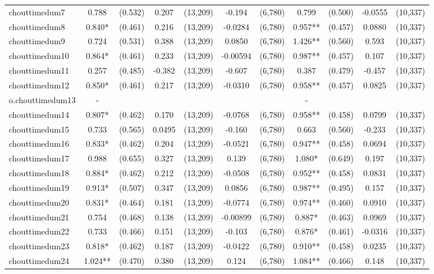 \documentclass[]{article}
\begin{document}
\begin{tabular}{lcccccccccc}
chouttimedum7 & 0.788 & (0.532) & 0.207 & (13,209) & -0.194 & (6,780) & 0.799 & (0.500) & -0.0555 & (10,337) \\
chouttimedum8 & 0.840* & (0.461) & 0.216 & (13,209) & -0.0284 & (6,780) & 0.957** & (0.457) & 0.0880 & (10,337) \\
chouttimedum9 & 0.724 & (0.531) & 0.388 & (13,209) & 0.0850 & (6,780) & 1.426** & (0.560) & 0.593 & (10,337) \\
chouttimedum10 & 0.864* & (0.461) & 0.233 & (13,209) & -0.00594 & (6,780) & 0.987** & (0.457) & 0.107 & (10,337) \\
chouttimedum11 & 0.257 & (0.485) & -0.382 & (13,209) & -0.607 & (6,780) & 0.387 & (0.479) & -0.457 & (10,337) \\
chouttimedum12 & 0.850* & (0.461) & 0.217 & (13,209) & -0.0310 & (6,780) & 0.958** & (0.457) & 0.0825 & (10,337) \\
o.chouttimedum13 & - &  &  &  &  &  & - &  &  &  \\
chouttimedum14 & 0.807* & (0.462) & 0.170 & (13,209) & -0.0768 & (6,780) & 0.958** & (0.458) & 0.0799 & (10,337) \\
chouttimedum15 & 0.733 & (0.565) & 0.0495 & (13,209) & -0.160 & (6,780) & 0.663 & (0.560) & -0.233 & (10,337) \\
chouttimedum16 & 0.833* & (0.462) & 0.204 & (13,209) & -0.0521 & (6,780) & 0.947** & (0.458) & 0.0694 & (10,337) \\
chouttimedum17 & 0.988 & (0.655) & 0.327 & (13,209) & 0.139 & (6,780) & 1.080* & (0.649) & 0.197 & (10,337) \\
chouttimedum18 & 0.884* & (0.462) & 0.212 & (13,209) & -0.0508 & (6,780) & 0.952** & (0.458) & 0.0831 & (10,337) \\
chouttimedum19 & 0.913* & (0.507) & 0.347 & (13,209) & 0.0856 & (6,780) & 0.987** & (0.495) & 0.157 & (10,337) \\
chouttimedum20 & 0.831* & (0.464) & 0.181 & (13,209) & -0.0774 & (6,780) & 0.974** & (0.460) & 0.0910 & (10,337) \\
chouttimedum21 & 0.754 & (0.468) & 0.138 & (13,209) & -0.00899 & (6,780) & 0.887* & (0.463) & 0.0969 & (10,337) \\
chouttimedum22 & 0.733 & (0.466) & 0.151 & (13,209) & -0.103 & (6,780) & 0.876* & (0.461) & -0.0316 & (10,337) \\
chouttimedum23 & 0.818* & (0.462) & 0.187 & (13,209) & -0.0422 & (6,780) & 0.910** & (0.458) & 0.0235 & (10,337) \\
chouttimedum24 & 1.024** & (0.470) & 0.380 & (13,209) & 0.124 & (6,780) & 1.084** & (0.466) & 0.148 & (10,337) \\

\end{tabular}
\end{document}
